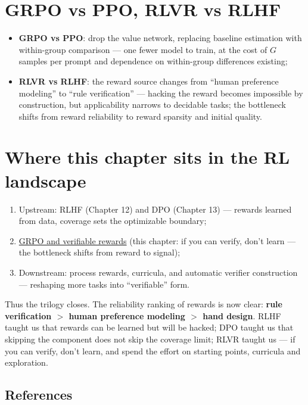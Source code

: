 \documentclass{article}
\begin{document}
\section*{GRPO vs PPO, RLVR vs RLHF}

\begin{itemize}
  \item \textbf{GRPO vs PPO}: drop the value network, replacing baseline estimation with within-group comparison --- one fewer model to train, at the cost of $G$ samples per prompt and dependence on within-group differences existing;
  \item \textbf{RLVR vs RLHF}: the reward source changes from ``human preference modeling'' to ``rule verification'' --- hacking the reward becomes impossible by construction, but applicability narrows to decidable tasks; the bottleneck shifts from reward reliability to reward sparsity and initial quality.
\end{itemize}

\section*{Where this chapter sits in the RL landscape}

\begin{enumerate}
  \item Upstream: RLHF (Chapter 12) and DPO (Chapter 13) --- rewards learned from data, coverage sets the optimizable boundary;
  \item \underline{GRPO and verifiable rewards} (this chapter: if you can verify, don't learn --- the bottleneck shifts from reward to signal);
  \item Downstream: process rewards, curricula, and automatic verifier construction --- reshaping more tasks into ``verifiable'' form.
\end{enumerate}

Thus the trilogy closes. The reliability ranking of rewards is now clear: \textbf{rule verification $>$ human preference modeling $>$ hand design}. RLHF taught us that rewards can be learned but will be hacked; DPO taught us that skipping the component does not skip the coverage limit; RLVR taught us --- if you can verify, don't learn, and spend the effort on starting points, curricula and exploration.

\subsection*{References}
\end{document}
